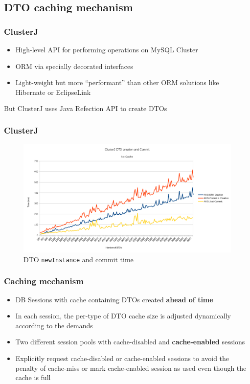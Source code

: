 \documentclass{beamer}
\begin{document}
\subsection{DTO caching mechanism}
\begin{frame}
\frametitle{ClusterJ}

\begin{itemize}
\item High-level API for performing operations on MySQL Cluster
\item ORM via specially decorated interfaces
\item Light-weight but more ``performant'' than other ORM solutions
  like Hibernate or EclipseLink
\end{itemize}

\pause
\centering
\vfill
{\color{red} But ClusterJ uses Java Refection API to create DTOs}
\end{frame}

\begin{frame}
\frametitle{ClusterJ}

\begin{figure}
\centering
\includegraphics[scale=0.35]{resources/dto_create_commit_no_cache.png}
\caption{DTO \texttt{newInstance} and commit time}
\end{figure}
\end{frame}

\begin{frame}
\frametitle{Caching mechanism}

\begin{itemize}
\item DB Sessions with cache containing DTOs created \textbf{ahead of
    time}

\item In each session, the per-type of DTO cache size is adjusted dynamically
  according to the demands

\item Two different session pools with cache-disabled and
  \textbf{cache-enabled} sessions

\item Explicitly request cache-disabled or cache-enabled sessions to
  avoid the penalty of cache-miss or mark cache-enabled session as
  used even though the cache is full

\end{itemize}
\end{frame}
\end{document}
